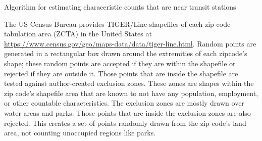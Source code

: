 \documentclass[11pt]{article}
\begin{document}
\begin{algorithm}\begingroup\fontsize{10}{10}\selectfont
\begin{algorithmic}
	\EndIf
\EndWhile
{}
		\EndFor
		\EndFor
	\EndIf
\EndFor
\end{algorithmic}\endgroup\caption{Algorithm for estimating characeristic counts that are near transit stations}\label{alg:rejsamp}
\end{algorithm}



The US Census Bureau provides TIGER/Line shapefiles of each zip code tabulation area (ZCTA) in the United States at \url{https://www.census.gov/geo/maps-data/data/tiger-line.html}. Random points are generated in a rectangular box drawn around the extremities of each zipcode's shape; these random points are accepted if they are within the shapefile or rejected if they are outside it. Those points that are inside the shapefile are tested against author-created exclusion zones. These zones are shapes within the zip code's shapefile area that are known to not have any population, employment, or other countable characteristics. The exclusion zones are mostly drawn over water areas and parks. Those points that are inside the exclusion zones are also rejected. This creates a set of points randomly drawn from the zip code's land area, not counting unoccupied regions like parks. 
\end{document}
